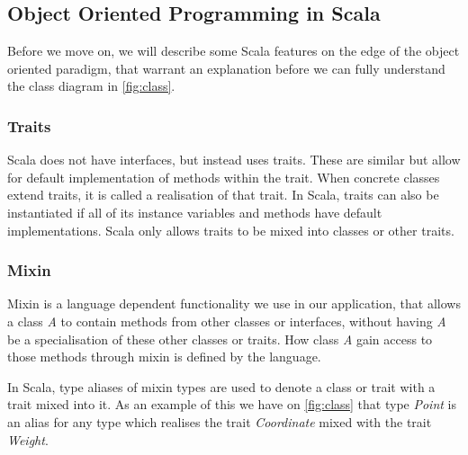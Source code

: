 \subsection{Object Oriented Programming in Scala}
Before we move on, we will describe some Scala features on the edge of the object oriented paradigm, that warrant an explanation before we can fully understand the class diagram in \cref{fig:class}.

\subsubsection{Traits}
Scala does not have interfaces, but instead uses traits. These are similar but allow for default implementation of methods within the trait. When concrete classes extend traits, it is called a realisation of that trait. In Scala, traits can also be instantiated if all of its instance variables and methods have default implementations. Scala only allows traits to be mixed into classes or other traits.

\subsubsection{Mixin}
Mixin is a language dependent functionality we use in our application, that allows a class \emph{A} to contain methods from other classes or interfaces, without having \emph{A} be a specialisation of these other classes or traits. How class \emph{A} gain access to those methods through mixin is defined by the language. 

In Scala, type aliases of mixin types are used to denote a class or trait with a trait mixed into it. As an example of this we have on \cref{fig:class} that type \emph{Point} is an alias for any type which realises the trait \emph{Coordinate} mixed with the trait \emph{Weight}.
